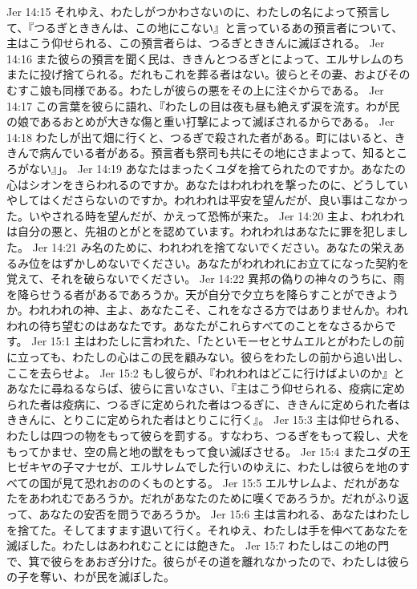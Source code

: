 Jer 14:15  それゆえ、わたしがつかわさないのに、わたしの名によって預言して、『つるぎとききんは、この地にこない』と言っているあの預言者について、主はこう仰せられる、この預言者らは、つるぎとききんに滅ぼされる。
Jer 14:16  また彼らの預言を聞く民は、ききんとつるぎとによって、エルサレムのちまたに投げ捨てられる。だれもこれを葬る者はない。彼らとその妻、およびそのむすこ娘も同様である。わたしが彼らの悪をその上に注ぐからである。
Jer 14:17  この言葉を彼らに語れ、『わたしの目は夜も昼も絶えず涙を流す。わが民の娘であるおとめが大きな傷と重い打撃によって滅ぼされるからである。
Jer 14:18  わたしが出て畑に行くと、つるぎで殺された者がある。町にはいると、ききんで病んでいる者がある。預言者も祭司も共にその地にさまよって、知るところがない』」。
Jer 14:19  あなたはまったくユダを捨てられたのですか。あなたの心はシオンをきらわれるのですか。あなたはわれわれを撃ったのに、どうしていやしてはくださらないのですか。われわれは平安を望んだが、良い事はこなかった。いやされる時を望んだが、かえって恐怖が来た。
Jer 14:20  主よ、われわれは自分の悪と、先祖のとがとを認めています。われわれはあなたに罪を犯しました。
Jer 14:21  み名のために、われわれを捨てないでください。あなたの栄えあるみ位をはずかしめないでください。あなたがわれわれにお立てになった契約を覚えて、それを破らないでください。
Jer 14:22  異邦の偽りの神々のうちに、雨を降らせうる者があるであろうか。天が自分で夕立ちを降らすことができようか。われわれの神、主よ、あなたこそ、これをなさる方ではありませんか。われわれの待ち望むのはあなたです。あなたがこれらすべてのことをなさるからです。
Jer 15:1  主はわたしに言われた、「たといモーセとサムエルとがわたしの前に立っても、わたしの心はこの民を顧みない。彼らをわたしの前から追い出し、ここを去らせよ。
Jer 15:2  もし彼らが、『われわれはどこに行けばよいのか』とあなたに尋ねるならば、彼らに言いなさい、『主はこう仰せられる、疫病に定められた者は疫病に、つるぎに定められた者はつるぎに、ききんに定められた者はききんに、とりこに定められた者はとりこに行く』。
Jer 15:3  主は仰せられる、わたしは四つの物をもって彼らを罰する。すなわち、つるぎをもって殺し、犬をもってかませ、空の鳥と地の獣をもって食い滅ぼさせる。
Jer 15:4  またユダの王ヒゼキヤの子マナセが、エルサレムでした行いのゆえに、わたしは彼らを地のすべての国が見て恐れおののくものとする。
Jer 15:5  エルサレムよ、だれがあなたをあわれむであろうか。だれがあなたのために嘆くであろうか。だれがふり返って、あなたの安否を問うであろうか。
Jer 15:6  主は言われる、あなたはわたしを捨てた。そしてますます退いて行く。それゆえ、わたしは手を伸べてあなたを滅ぼした。わたしはあわれむことには飽きた。
Jer 15:7  わたしはこの地の門で、箕で彼らをあおぎ分けた。彼らがその道を離れなかったので、わたしは彼らの子を奪い、わが民を滅ぼした。
